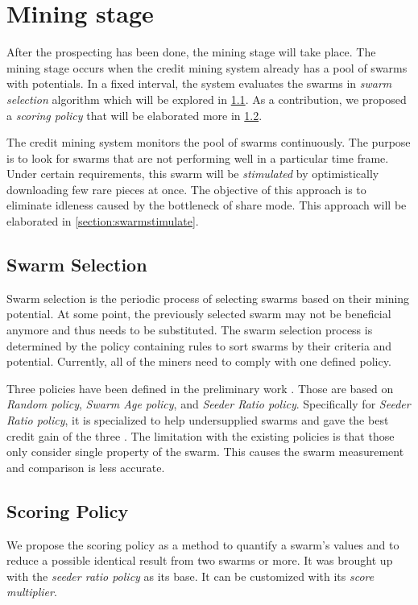 \section{Mining stage}
After the prospecting has been done, the mining stage will take place. The mining stage occurs when the credit mining system already has a pool of swarms with potentials. In a fixed interval, the system evaluates the swarms in \textit{swarm selection} algorithm which will be explored in \ref{section:swarmselect}. As a contribution, we proposed a \textit{scoring policy} that will be elaborated more in \ref{section:scorepolicy}.

The credit mining system monitors the pool of swarms continuously. The purpose is to look for swarms that are not performing well in a particular time frame. Under certain requirements, this swarm will be \textit{stimulated} by optimistically downloading few rare pieces at once. The objective of this approach is to eliminate idleness caused by the bottleneck of share mode. This approach will be elaborated in \ref{section:swarmstimulate}.

\subsection{Swarm Selection}
\label{section:swarmselect}
Swarm selection is the periodic process of selecting swarms based on their mining potential. At some point, the previously selected swarm may not be beneficial anymore and thus needs to be substituted. The swarm selection process is determined by the policy containing rules to sort swarms by their criteria and potential. Currently, all of the miners need to comply with one defined policy.

Three policies have been defined in the preliminary work \cite{2015:creditmining:capota}. Those are based on \textit{Random policy}, \textit{Swarm Age policy}, and \textit{Seeder Ratio policy}. Specifically for \textit{Seeder Ratio policy}, it is specialized to help undersupplied swarms and gave the best credit gain of the three \cite{2015:creditmining:capota}. The limitation with the existing policies is that those only consider single property of the swarm. This causes the swarm measurement and comparison is less accurate.

\subsection{Scoring Policy}
\label{section:scorepolicy}
We propose the scoring policy as a method to quantify a swarm's values and to reduce a possible identical result from two swarms or more. It was brought up with the \textit{seeder ratio policy} as its base. It can be customized with its \textit{score multiplier}.

